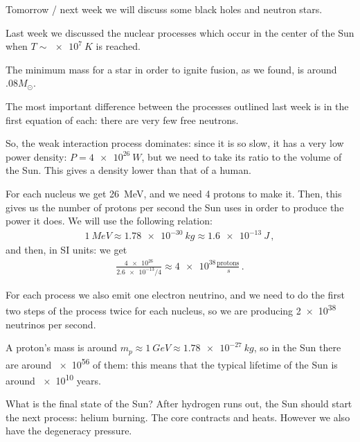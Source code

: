 \documentclass[main.tex]{subfiles}
\begin{document}


Tomorrow / next week we will discuss some black holes and neutron stars. 

Last week we discussed the nuclear processes which occur in the center of the Sun when \(T \sim \SI{e7}{K}\) is reached. 

The minimum mass for a star in order to ignite fusion, as we found, is around \(\num{.08} M_{\odot}\). 

The most important difference between the processes outlined last week is in the first equation of each: there are very few free neutrons.

So, the weak interaction process dominates: since it is so slow, it has a very low power density: \(P = \SI{4e26}{W}\), but we need to take its ratio to the volume of the Sun. This gives a density lower than that of a human. 

For each  nucleus we get \SI{26}{MeV}, and we need 4 protons to make it. Then, this gives us the number of protons per second the Sun uses in order to produce the power it does. 
We will use the following relation: 
%
\begin{align}
  \SI{1}{MeV} \approx \SI{1.78e-30}{kg} \approx \SI{1.6e-13}{J}
\,,
\end{align}
%
and then, in SI units: we get 
%
\begin{align}
  \frac{\num{4e26}}{\num{2.6e-13} / 4} \approx \num{4e38} \frac{\text{protons}}{\SI{}{s}}
\,.
\end{align}

For each process we also emit one electron neutrino, and we need to do the first two steps of the process twice for each  nucleus, so we are producing \num{2e38} neutrinos per second. 

A proton's mass is around \(m_p \approx \SI{1}{GeV} \approx \SI{1.78e-27}{kg}\), so in the Sun there are around \num{e56} of them: this means that the typical lifetime of the Sun is around \num{e10} years. 

What is the final state of the Sun? After hydrogen runs out, the Sun should start the next process: helium burning. The core contracts and heats. However we also have the degeneracy pressure. 
\end{document}
